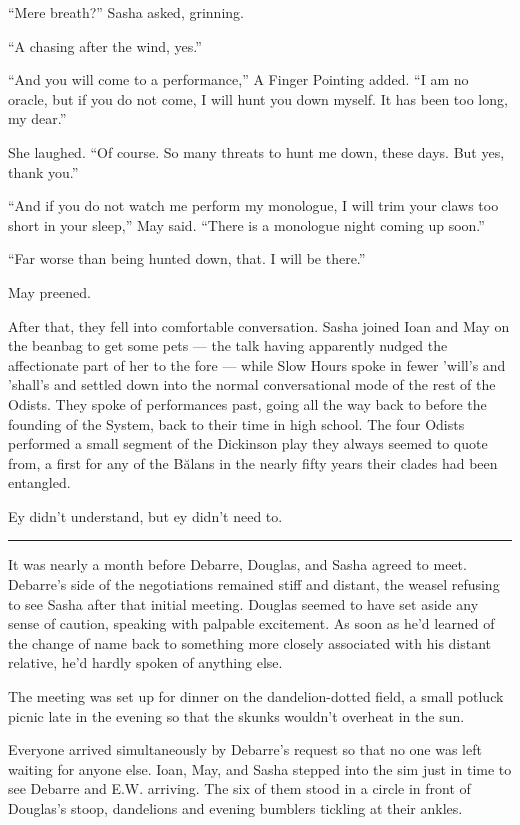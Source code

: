 ``Mere breath?'' Sasha asked, grinning.

``A chasing after the wind, yes.''

``And you will come to a performance,'' A Finger Pointing added. ``I am no oracle, but if you do not come, I will hunt you down myself. It has been too long, my dear.''

She laughed. ``Of course. So many threats to hunt me down, these days. But yes, thank you.''

``And if you do not watch me perform my monologue, I will trim your claws too short in your sleep,'' May said. ``There is a monologue night coming up soon.''

``Far worse than being hunted down, that. I will be there.''

May preened.

After that, they fell into comfortable conversation. Sasha joined Ioan and May on the beanbag to get some pets — the talk having apparently nudged the affectionate part of her to the fore — while Slow Hours spoke in fewer 'will's and 'shall's and settled down into the normal conversational mode of the rest of the Odists. They spoke of performances past, going all the way back to before the founding of the System, back to their time in high school. The four Odists performed a small segment of the Dickinson play they always seemed to quote from, a first for any of the Bălans in the nearly fifty years their clades had been entangled.

Ey didn't understand, but ey didn't need to.

\begin{center}\rule{0.5\linewidth}{0.5pt}\end{center}

It was nearly a month before Debarre, Douglas, and Sasha agreed to meet. Debarre's side of the negotiations remained stiff and distant, the weasel refusing to see Sasha after that initial meeting. Douglas seemed to have set aside any sense of caution, speaking with palpable excitement. As soon as he'd learned of the change of name back to something more closely associated with his distant relative, he'd hardly spoken of anything else.

The meeting was set up for dinner on the dandelion-dotted field, a small potluck picnic late in the evening so that the skunks wouldn't overheat in the sun.

Everyone arrived simultaneously by Debarre's request so that no one was left waiting for anyone else. Ioan, May, and Sasha stepped into the sim just in time to see Debarre and E.W. arriving. The six of them stood in a circle in front of Douglas's stoop, dandelions and evening bumblers tickling at their ankles.

